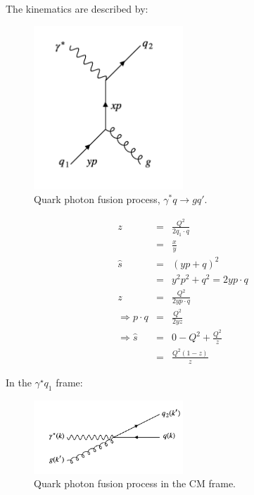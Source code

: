 The kinematics are described by:

\begin{figure}[!htb]
  \begin{center}
    \includegraphics[width=0.5\textwidth]{images/web_feynman/image_70.png}
    \caption[Quark photon fusion process]{Quark photon fusion process, $\gamma^*q\to gq'$.}
    \label{fig:ch14_QGammaToQG}
  \end{center}
\end{figure}

\begin{eqnarray*}
  z & = & \frac{Q^2}{2q_1 \cdot q} \\
  & = & \frac{x}{y} \\
  \hat{s} & = & \left(yp + q\right)^2 \\
  & = & y^2p^2 + q^2 = 2yp \cdot q \\
  z & = & \frac{Q^2}{2y p \cdot q} \\
  \Rightarrow p \cdot q & = & \frac{Q^2}{2yz} \\
  \Rightarrow \hat{s} & = & 0 - Q^2 + \frac{Q^2}{z} \\
  & = & \frac{Q^2\left(1 - z\right)}{z}
\end{eqnarray*}

In the $\gamma^{\star}q_1$ frame:

\begin{figure}[!htb]
  \begin{center}
    \includegraphics[width=0.5\textwidth]{images/web_feynman/image_71.png}
    \caption[CM quark photon fusion process]{Quark photon fusion process in the CM frame.}
    \label{fig:ch14_QGammaToQGCM}
  \end{center}
\end{figure}

